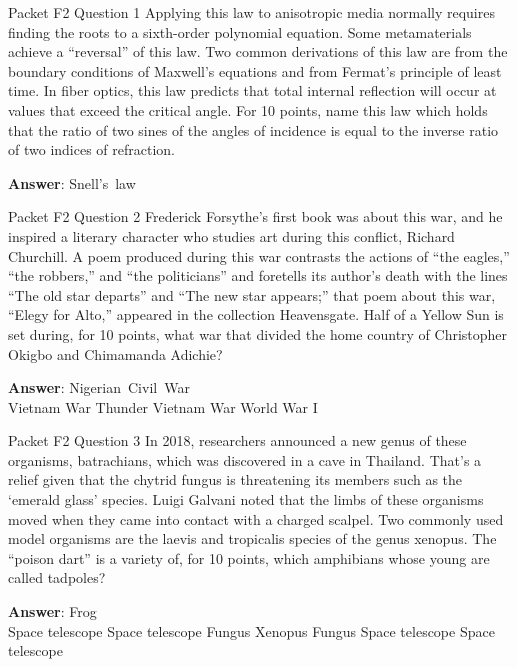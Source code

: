 \begin{frame}{Packet F2 Question 1}
Applying this law to anisotropic media normally     requires finding the roots to a sixth-order polynomial equation. Some metamaterials achieve a “reversal” of this law. Two common derivations of this law are from the boundary conditions of Maxwell’s equations and from Fermat’s principle of least time. In fiber optics, this law predicts that total internal reflection will occur at values     that exceed the critical angle. For 10 points, name this law which holds that the ratio of two sines of the angles of incidence is equal to the inverse ratio of two indices of refraction.

\textbf{Answer}: Snell's\ law\\
\end{frame}

\begin{frame}{Packet F2 Question 2}
Frederick Forsythe’s first book was about this war, and he inspired a literary character   who studies art during this conflict, Richard Churchill. A poem produced during this war contrasts the actions of “the eagles,” “the robbers,” and “the politicians” and foretells its author’s death with the lines “The old star departs” and “The new star appears;” that poem about this war, “Elegy for Alto,” appeared in the collection Heavensgate. Half of a Yellow Sun is set during, for 10 points, what war that divided the home country of Christopher Okigbo and Chimamanda Adichie?        

\textbf{Answer}: Nigerian\ Civil\ War\\
 Vietnam War
 Thunder
 Vietnam War
 World War I
\end{frame}

\begin{frame}{Packet F2 Question 3}
In 2018, researchers announced     a new genus of these organisms, batrachians, which was discovered in a cave in Thailand. That's a relief given that the chytrid fungus is threatening its members such as the `emerald glass' species. Luigi Galvani noted that the limbs of these organisms moved when they came into contact with   a charged scalpel. Two commonly used model organisms are the laevis and tropicalis species of the genus xenopus. The “poison dart” is a variety of, for 10 points, which amphibians whose young are called tadpoles?        

\textbf{Answer}: Frog\\
 Space telescope
 Space telescope
 Fungus
 Xenopus
 Fungus
 Space telescope
 Space telescope
\end{frame}

